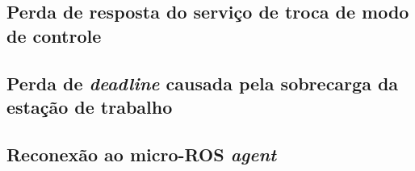 \subsection*{Perda de resposta do serviço de troca de modo de controle}




\subsection*{Perda de \textit{deadline} causada pela sobrecarga da estação de trabalho}




\subsection*{Reconexão ao micro-ROS \textit{agent}}






\clearpage